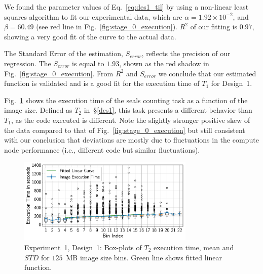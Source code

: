 We found the parameter values of Eq.~\ref{eq:des1_til} by using a non-linear 
least squares algorithm to fit our experimental data, which are 
$\alpha= 1.92 \times 10^{-2}$, and $\beta = 60.49$ (see red line in 
Fig.~\ref{fig:stage_0_execution}). $R^{2}$ of our fitting is $0.97$, showing a 
very good fit of the curve to the actual data.

The Standard Error of the estimation, $S_{error}$, reflects the precision of 
our regression. The $S_{error}$ is equal to $1.93$, shown as the red shadow in 
Fig.~\ref{fig:stage_0_execution}. From $R^{2}$ and $S_{error}$ we conclude 
that our estimated function is validated and is a good fit for the execution 
time of $T_{1}$ for Design~1.


Fig.~\ref{fig:stage_1_execution} shows the execution time of the seals 
counting task as a function of the image size. Defined as $T_{2}$ 
in~\S\ref{des1}, this task presents a different behavior than $T_{1}$, as the 
code executed is different. Note the slightly stronger positive skew of the 
data compared to that of Fig.~\ref{fig:stage_0_execution} but still consistent 
with our conclusion that deviations are mostly due to fluctuations in the 
compute node performance (i.e., different code but similar fluctuations).

\begin{figure}[t]
    \centering
    \includegraphics[width=0.75\textwidth]{figures/designs/stage_1_tx_box.pdf}
    \caption{Experiment~1, Design~1: Box-plots of $T_{2}$ execution time, mean 
    and $STD$ for $125$~MB image size bins. Green line shows fitted linear 
    function.}
    \label{fig:stage_1_execution}
\end{figure}

